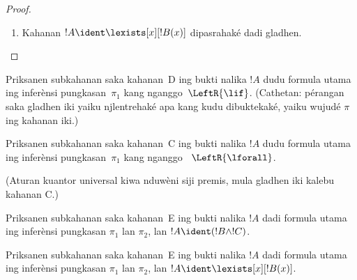 \documentclass[../../../include/open-logic-section]{subfiles}
\begin{document}
\begin{proof}
\begin{enumerate}
!!{proof}~$\pi_1'$ nduwèni sekèn pungkasan
$\Gamma \Sequent \Delta, !B(c)$, ing ngendi $c$~variabel
eigen saka inferènsi~$\RightR{\lforall}$. Mula $c$~ora ana
ing~$!B(x)$, $\Gamma$, utawa~$\Delta$. Kita anggep
!!{proof}~$\pi$ reguler, mula $c$~mung dadi variabel eigen
ing inferènsi~$\RightR{\lforall}$ kang nyusul iki lan
mung ana ing sadhuwuré, yaiku mung ana ing~$\pi_1'$,
lan dudu variabel eigen sawijining inferènsi ing~$\pi_1'$.
Amarga $c$ ora ana ing~$\pi_2$, variabel iku ora bisa ana ing~$t$.
Miturut ,
!!{proof}~$\Subst{\pi_1'}{t}{c}$ iku !!a{proof} kanggo
$\Gamma \Sequent \Delta, !B(t)$. Saiki hipotesis induksi
ditrapaké marang !!{proof}
\[
\AxiomC{}
\RightLabel{$\Subst{\pi_1'}{t}{c}$}
\Deduce$\Gamma \fCenter \Delta, !B(t)$
\AxiomC{}
\RightLabel{$\pi_2''$}
\Deduce$!B(t), \Gamma \fCenter \Delta$
\RightLabel{\CutCS}
\BinaryInf$\Gamma \fCenter \Delta$
\DisplayProof
\]
(Hipotesis induksi bisa ditrapaké amarga !!{formula} cuté
yaiku~$!B(t)$, mula !!{proof} iku nduwèni pangkat cut
luwih cilik tinimbang~$\pi$.)
\item Kahanan $!A \ident \lexists[x][!B(x)]$ dipasrahaké
dadi gladhen.
\end{enumerate}
\end{proof}

\begin{prob}
Priksanen subkahanan saka kahanan~D ing bukti
 nalika $!A$ dudu formula utama
ing inferènsi pungkasan~$\pi_1$ kang nganggo~$\LeftR{\lif}$.
(Cathetan: pérangan saka gladhen iki yaiku njlentrehaké
apa kang kudu dibuktekaké, yaiku wujudé $\pi$ ing kahanan iki.)
\end{prob}

\begin{prob}
Priksanen subkahanan saka kahanan~C ing bukti
 nalika $!A$ dudu formula utama
ing inferènsi pungkasan~$\pi_1$ kang nganggo
~$\LeftR{\lforall}$.
\end{prob}
(Aturan kuantor universal kiwa nduwèni siji premis, mula gladhen iki kalebu kahanan C.)

\begin{prob}
Priksanen subkahanan saka kahanan~E ing bukti
 nalika $!A$ dadi formula utama
ing inferènsi pungkasan $\pi_1$ lan $\pi_2$,
lan $!A \ident (!B \land !C)$.
\end{prob}

\begin{prob}
Priksanen subkahanan saka kahanan~E ing bukti
 nalika $!A$ dadi formula utama
ing inferènsi pungkasan $\pi_1$ lan $\pi_2$,
lan $!A \ident \lexists[x][!B(x)]$.
\end{prob}
\end{document}
